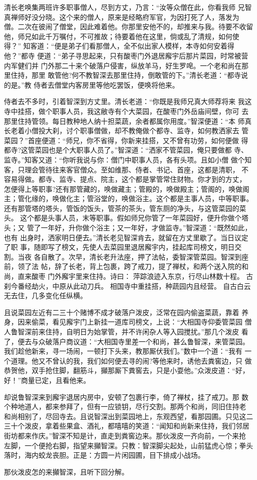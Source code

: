 清长老唤集两班许多职事僧人，尽到方丈，乃言：“汝等众僧在此，你看我师
兄智真禅师好没分晓。这个来的僧人，原来是经略府军官，为因打死了人，落发为
僧。二次在彼闹了僧堂，因此难着他。你那里安他不的，却推来与我。待要不收留
他，师兄如此千万嘱付，不可推故；待要着他在这里，倘或乱了清规，如何使得？”
知客道：“便是弟子们看那僧人，全不似出家人模样，本寺如何安着得他？”都寺
便道：“弟子寻思起来，只有酸枣门外退居廨宇后那片菜园，时常被营内军健们并
门外那二十来个破落户侵害，纵放羊马，好生罗唣。一个老和尚在那里住持，那里
敢管他?何不教智深去那里住持，倒敢管的下。”清长老道：“都寺说的是。”教
侍者去僧堂内客房里等他吃罢饭，便唤将他来。

侍者去不多时，引着智深到方丈里。清长老道：“你既是我师兄真大师荐将来
我这寺中挂搭，做个职事人员，我这敝寺有个大菜园，在酸枣门外岳庙间壁，你可
去那里住持管领。每日教种地人纳十担菜蔬，余者都属你用度。”智深便道：“本
师真长老着小僧投大刹，讨个职事僧做，却不教俺做个都寺、监寺，如何教洒家去
管菜园？”首座便道：“师兄，你不省得，你新来挂搭，又不曾有功劳，如何便做
得都寺?这管菜园也是个大职事人员了。”智深道：“洒家不管菜园，俺只要做都
寺、监寺。”知客又道：“你听我说与你：僧门中职事人员，各有头项。且如小僧
做个知客，只理会管待往来客官僧众。至如维那、侍者、书记、首座，这都是清职，
不容易得做。都寺、监寺、提点、院主，这个都是掌管常住财物。你才到的方丈，
怎便得上等职事?还有那管藏的，唤做藏主；管殿的，唤做殿主；管阁的，唤做阁
主；管化缘的，唤做化主；管浴堂的，唤做浴主。这个都是主事人员，中等职事。
还有那管塔的塔头，管饭的饭头，管茶的茶头，管东厕的净头，与这管菜园的菜头。
这个都是头事人员，末等职事。假如师兄你管了一年菜园好，便升你做个塔头；又
管了一年好，升你做个浴主；又一年好，才做监寺。”智深道：“既然如此，也有
出身时，洒家明日便去。”清长老见智深肯去，就留在方丈里歇了。当日议定了职
事，随即写了榜文，先使人去菜园里退居廨宇内，挂起库司榜文，明日交割。当夜
各自散了。次早，清长老升法座，押了法帖，委智深管菜园。智深到座前，领了法
帖，辞了长老，背上包裹，跨了戒刀，提了禅杖，和两个送入院的和尚，直来酸枣
门外廨宇里来住持。诗曰：
萍踪浪迹入东京，行尽山林数十程。
古刹今番经劫火，中原从此动刀兵。
相国寺中重挂搭，种蔬园内且经营。
自古白云无去住，几多变化任纵横。

且说菜园左近有二三十个赌博不成才破落户泼皮，泛常在园内偷盗菜蔬，靠着
养身，因来偷菜，看见廨宇门上新挂一道库司榜文，上说：“大相国寺仰委管菜园
僧人鲁智深前来住持，自明日为始掌管，并不许闲杂人等入园搅扰。”那几个泼皮
看了，便去与众破落户商议道：“大相国寺里差一个和尚，甚么鲁智深，来管菜园。
我们趁他新来，寻一场闹，一顿打下头来，教那厮伏我们。”数中一个道：“我有
一个道理。他又不曾认的我，我们如何便去寻的闹?等他来时，诱他去粪窖边，只
做恭贺他，双手抢住脚，翻筋斗，攧那厮下粪窖去，只是小耍他。”众泼皮道：“好，
好！”商量已定，且看他来。

却说鲁智深来到廨宇退居内房中，安顿了包裹行李，倚了禅杖，挂了戒刀。那
数个种地道人，都来参拜了，但有一应锁钥，尽行交割。那两个和尚，同旧住持老
和尚相别了，尽回寺去。且说智深出到菜园地上，东观西望，看那园圃。只见这二
三十个泼皮，拿着些果盒、酒礼，都嘻嘻的笑道：“闻知和尚新来住持，我们邻居
街坊都来作庆。”智深不知是计，直走到粪窖边来。那伙泼皮一齐向前，一个来抢
左脚，一个便抢右脚，指望来攧智深。只教：智深脚尖起处，山前猛虎心惊；拳头
落时，海内蛟龙丧胆。正是：方圆一片闲园圃，目下排成小战场。

那伙泼皮怎的来攧智深，且听下回分解。